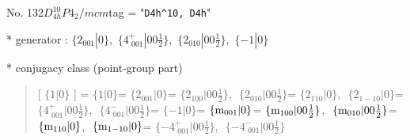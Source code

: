 \documentclass[fleqn,10pt,landscape]{jsarticle}
\begin{document}
\newpage

No. 132\quad$D_{4h}^{10}$\quad$P4_2/mcm$\quad[ tetragonal ]
tag = "{\tt D4h^10, D4h}"

* generator : $\{2{}_{001}|0\},\,\,\{4^{+}_{\,\,001}|0 0 \frac{1}{2}\},\,\,\{2{}_{010}|0 0 \frac{1}{2}\},\,\,\{-1|0\}$

* conjugacy class (point-group part)
\begin{quote}
[ $\{1|0\}$ ] = \quad $\{1|0\}$\newline[ $\{2{}_{001}|0\}$ ] = \quad $\{2{}_{001}|0\}$\newline[ $\{2{}_{100}|0 0 \frac{1}{2}\}$ ] = \quad $\{2{}_{100}|0 0 \frac{1}{2}\}$,\,\, $\{2{}_{010}|0 0 \frac{1}{2}\}$\newline[ $\{2{}_{110}|0\}$ ] = \quad $\{2{}_{110}|0\}$,\,\, $\{2{}_{1-10}|0\}$\newline[ $\{4^{+}_{\,\,001}|0 0 \frac{1}{2}\}$ ] = \quad $\{4^{+}_{\,\,001}|0 0 \frac{1}{2}\}$,\,\, $\{4^{-}_{\,\,001}|0 0 \frac{1}{2}\}$\newline[ $\{-1|0\}$ ] = \quad $\{-1|0\}$\newline[ $\{{\rm m}_{001}|0\}$ ] = \quad $\{{\rm m}_{001}|0\}$\newline[ $\{{\rm m}_{100}|0 0 \frac{1}{2}\}$ ] = \quad $\{{\rm m}_{100}|0 0 \frac{1}{2}\}$,\,\, $\{{\rm m}_{010}|0 0 \frac{1}{2}\}$\newline[ $\{{\rm m}_{110}|0\}$ ] = \quad $\{{\rm m}_{110}|0\}$,\,\, $\{{\rm m}_{1-10}|0\}$\newline[ $\{-4^{+}_{\,\,001}|0 0 \frac{1}{2}\}$ ] = \quad $\{-4^{+}_{\,\,001}|0 0 \frac{1}{2}\}$,\,\, $\{-4^{-}_{\,\,001}|0 0 \frac{1}{2}\}$\newline
\end{quote}
\end{document}
